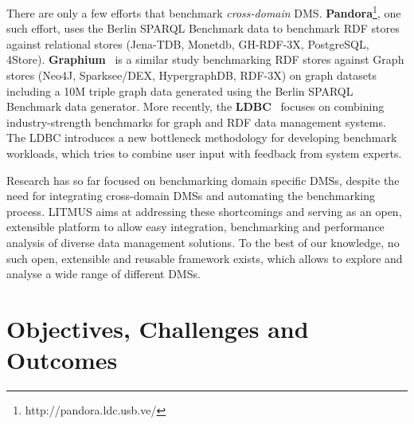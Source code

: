 \documentclass{llncs}
\begin{document}
    There are only a few efforts that benchmark \textit{cross-domain} DMS.
    \textbf{Pandora}\footnote{http://pandora.ldc.usb.ve/}, one such effort, uses the Berlin SPARQL Benchmark data to benchmark RDF stores against relational stores (Jena-TDB, Monetdb, GH-RDF-3X, PostgreSQL, 4Store). \textbf{Graphium}~\cite{flores2013graphium} is a similar study benchmarking RDF stores against Graph stores (Neo4J, Sparksee/DEX, HypergraphDB, RDF-3X) on graph datasets including a 10M triple graph data generated using the Berlin SPARQL Benchmark data generator.
    More recently, the \textbf{LDBC}~\cite{DBLP:journals/sigmod/AnglesBLF0ENMKT14} focuses on combining industry-strength benchmarks for graph and RDF data management systems.
    The LDBC introduces a new bottleneck methodology for developing benchmark workloads, which tries to combine user input with feedback from system experts.
    
    Research has so far focused on benchmarking domain specific DMSs, despite the need for integrating cross-domain DMSs and automating the benchmarking process.
    LITMUS aims at addressing these shortcomings and serving as an open, extensible platform to allow easy integration, benchmarking and performance analysis of diverse data management solutions.
    To the best of our knowledge, no such open, extensible and reusable framework exists, which allows to explore and analyse a wide range of different DMSs.
    

\section{Objectives, Challenges and Outcomes}\label{Objectives}
\end{document}

